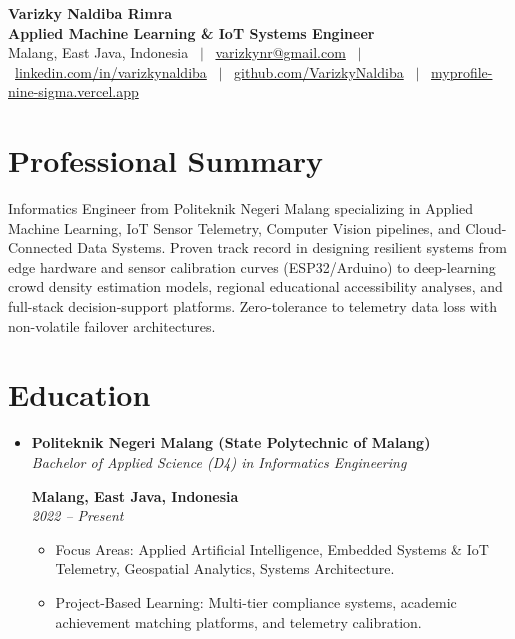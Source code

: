 \documentclass[letterpaper,10pt]{article}
\newcommand{\resumeItem}[1]{
  \item\small{
    {#1 \vspace{-1.5pt}}
  }
}
\newcommand{\resumeSubheading}[4]{
  \vspace{-1.5pt}\item
    \parbox[t]{0.70\linewidth}{\textbf{#1} \\ \textit{\small #3}}%
    \hfill%
    \parbox[t]{0.29\linewidth}{\raggedleft \textbf{#2} \\ \textit{\small #4}}\par
    \vspace{-2pt}
}
\newcommand{\resumeSubHeadingListStart}{\begin{itemize}[leftmargin=0.05in, label={}]}
\newcommand{\resumeSubHeadingListEnd}{\end{itemize}}
\newcommand{\resumeItemListStart}{\begin{itemize}[leftmargin=0.15in, itemsep=1.5pt]}
\newcommand{\resumeItemListEnd}{\end{itemize}\vspace{-3pt}}
\begin{document}
\begin{center}
    {\Huge \bfseries \color{primaryDark} Varizky Naldiba Rimra} \\ \vspace{3pt}
    \small \textbf{Applied Machine Learning \& IoT Systems Engineer} \\ \vspace{4pt}
    \small Malang, East Java, Indonesia \ $|$ \ 
    \href{mailto:varizkynr@gmail.com}{varizkynr@gmail.com} \ $|$ \ 
    \href{https://linkedin.com/in/varizkynaldiba/}{linkedin.com/in/varizkynaldiba} \ $|$ \ 
    \href{https://github.com/VarizkyNaldiba}{github.com/VarizkyNaldiba} \ $|$ \ 
    \href{https://myprofile-nine-sigma.vercel.app/}{myprofile-nine-sigma.vercel.app}
\end{center}
\vspace{-6pt}

\section{Professional Summary}
\begin{flushleft}
\small
Informatics Engineer from Politeknik Negeri Malang specializing in Applied Machine Learning, IoT Sensor Telemetry, Computer Vision pipelines, and Cloud-Connected Data Systems. Proven track record in designing resilient systems from edge hardware and sensor calibration curves (ESP32/Arduino) to deep-learning crowd density estimation models, regional educational accessibility analyses, and full-stack decision-support platforms. Zero-tolerance to telemetry data loss with non-volatile failover architectures.
\end{flushleft}
\vspace{-6pt}

\section{Education}
  \resumeSubHeadingListStart
    \resumeSubheading
      {Politeknik Negeri Malang (State Polytechnic of Malang)}{Malang, East Java, Indonesia}
      {Bachelor of Applied Science (D4) in Informatics Engineering}{2022 -- Present}
      \resumeItemListStart
        \resumeItem{Focus Areas: Applied Artificial Intelligence, Embedded Systems \& IoT Telemetry, Geospatial Analytics, Systems Architecture.}
        \resumeItem{Project-Based Learning: Multi-tier compliance systems, academic achievement matching platforms, and telemetry calibration.}
      \resumeItemListEnd
  \resumeSubHeadingListEnd
\end{document}
